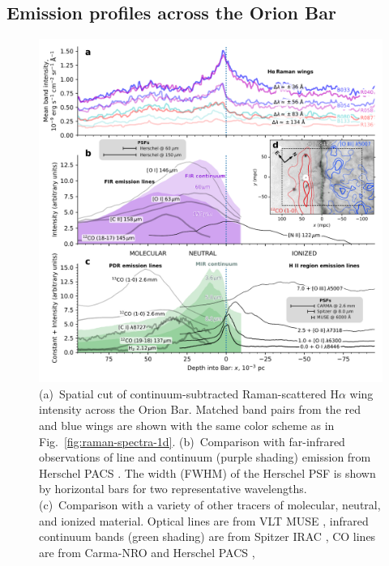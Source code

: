 \documentclass[useAMS, usenatbib, a4paper]{mnras}
\begin{document}
\subsection{Emission profiles across the Orion Bar}
\label{sec:emiss-prof-across}

\begin{figure}
  \includegraphics[width=\linewidth]{figs/raman-bar-multi-profile-4part}
  \caption{(a)~Spatial cut of continuum-subtracted Raman-scattered
    H\(\alpha\) wing intensity across the Orion Bar. Matched band pairs
    from the red and blue wings are shown with the same color scheme
    as in Fig.~\ref{fig:raman-spectra-1d}. (b)~Comparison with
    far-infrared observations of line and continuum (purple shading)
    emission from Herschel PACS \citep{Bernard-Salas:2012a}.  The
    width (FWHM) of the Herschel PSF is shown by horizontal bars for
    two representative wavelengths. (c)~Comparison with a variety of
    other tracers of molecular, neutral, and ionized material.
    Optical lines are from VLT MUSE \citep{Weilbacher:2015a}, infrared
    continuum bands (green shading) are from Spitzer IRAC
    \citep{Megeath:2012a}, CO lines are from Carma-NRO
    \citep{Kong:2018a} and Herschel PACS \citep{Parikka:2018a},
}
\end{figure}
\end{document}

